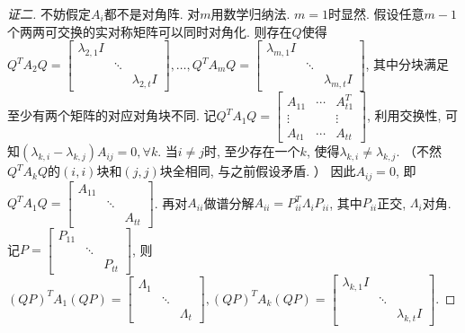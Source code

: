 \documentclass{ctexart}
\begin{document}
\begin{proof}[证二]
	不妨假定$A_i$都不是对角阵. 对$m$用数学归纳法. $m=1$时显然. 
	假设任意$m-1$个两两可交换的实对称矩阵可以同时对角化. 则存在$Q$使得$Q^TA_2Q=\begin{bmatrix}
		\lambda_{2,1}I \\ & \ddots\\ && \lambda_{2,t}I
	\end{bmatrix},\dots,Q^TA_mQ=\begin{bmatrix}
		\lambda_{m,1}I \\ & \ddots\\ && \lambda_{m,t}I
	\end{bmatrix}$, 其中分块满足至少有两个矩阵的对应对角块不同. 
	记$Q^TA_1Q=\begin{bmatrix}
		A_{11} & \cdots & A_{t1}^T\\
		\vdots && \vdots \\
		A_{t1} & \cdots & A_{tt}
	\end{bmatrix}$, 利用交换性, 可知$(\lambda_{k,i}-\lambda_{k,j})A_{ij}=0,\forall k$. 当$i\ne j$时, 至少存在一个$k$, 使得$\lambda_{k,i}\ne \lambda_{k,j}$. （不然$Q^TA_kQ$的$(i,i)$块和$(j,j)$块全相同, 与之前假设矛盾. ）
	因此$A_{ij}=0$, 即$Q^TA_1Q=\begin{bmatrix}
		A_{11} \\ & \ddots \\ &&A_{tt}
	\end{bmatrix}$. 再对$A_{ii}$做谱分解$A_{ii}=P_{ii}^T\Lambda_i P_{ii}$, 其中$P_{ii}$正交, $\Lambda_i$对角. 
	记$P=\begin{bmatrix}
		P_{11} \\ &\ddots \\ && P_{tt}
	\end{bmatrix}$, 则$(QP)^TA_1(QP)=\begin{bmatrix}
		\Lambda_1 \\ &\ddots \\ && \Lambda_t
	\end{bmatrix},(QP)^TA_k(QP)=\begin{bmatrix}
		\lambda_{k,1}I \\ & \ddots\\ && \lambda_{k,t}I
	\end{bmatrix}$. 
\end{proof}

\clearpage
\end{document}
